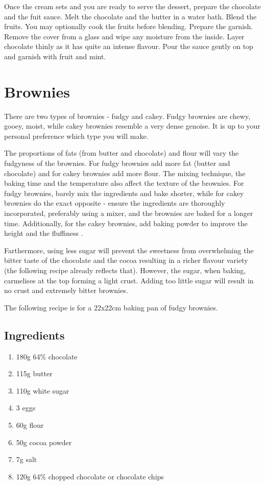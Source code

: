Once the cream sets and you are ready to serve the dessert, prepare the
chocolate and the fuit sauce. Melt the chocolate and the butter in a water
bath. Blend the fruits. You may optionally cook the fruits before blending.
Prepare the garnish. Remove the cover from a glass and wipe any moisture from
the inside. Layer chocolate thinly as it has quite an intense flavour. Pour the
sauce gently on top and garnish with fruit and mint.

\section{Brownies}
There are two types of brownies - fudgy and cakey. Fudgy brownies are chewy,
gooey, moist, while cakey brownies resemble a very dense genoise. It is up to
your personal preference which type you will make.

The proportions of fats (from butter and chocolate) and flour will vary the
fudgyness of the brownies. For fudgy brownies add more fat (butter and
chocolate) and for cakey brownies add more flour. The mixing technique, the
baking time and the temperature also affect the texture of the brownies. For
fudgy brownies, barely mix the ingredients and bake shorter, while for cakey
brownies do the exact opposite - ensure the ingredients are thoroughly
incorporated, preferably using a mixer, and the brownies are baked for a longer
time. Additionally, for the cakey brownies, add baking powder to improve the
height and the fluffiness .

Farthermore, using less sugar will prevent the sweetness from overwhelming the
bitter taste of the chocolate and the cocoa resulting in a richer flavour
variety (the following recipe already reflects that). However, the sugar, when
baking, carmelises at the top forming a light crust. Adding too little sugar
will result in no crust and extremely bitter brownies.

The following recipe is for a 22x22cm baking pan of fudgy brownies.

\subsection*{Ingredients}
\begin{enumerate}
  \item 180g 64\% chocolate
  \item 115g butter
  \item 110g white sugar
  \item 3 eggs
  \item 60g flour
  \item 50g cocoa powder
  \item 7g salt
  \item 120g 64\% chopped chocolate or chocolate chips
\end{enumerate}

